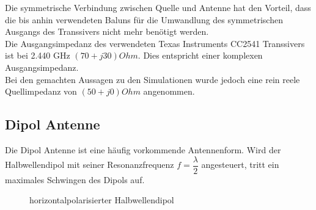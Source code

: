 Die symmetrische Verbindung zwischen Quelle und Antenne hat den Vorteil, dass die bis anhin verwendeten Baluns für die Umwandlung des symmetrischen Ausgangs des Transsivers nicht mehr benötigt werden. \\
Die Ausgangsimpedanz des verwendeten Texas Instruments CC2541 Transsivers ist bei 2.440 GHz $(70+j30) Ohm$. Dies entspricht einer komplexen Ausgangsimpedanz. \\Bei den gemachten Aussagen zu den Simulationen wurde jedoch eine rein reele Quellimpedanz von $(50+j0) Ohm$ angenommen.

\subsection{Dipol Antenne}
Die Dipol Antenne ist eine häufig vorkommende Antennenform.  Wird der Halbwellendipol mit seiner Resonanzfrequenz $f=\dfrac{\lambda}{2}$ angesteuert, tritt ein maximales Schwingen des Dipols auf.
\begin{figure}[h]%
	\begin{center}
	\end{center}
\caption{horizontalpolarisierter Halbwellendipol}
\label{fig:HalbWellenDipolHorizontal}
\end{figure}


